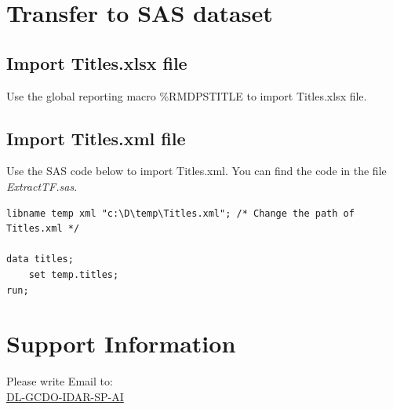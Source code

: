 \documentclass[11pt]{article}
\begin{document}
\section{Transfer to SAS dataset}
\label{sec:org0719498}
\subsection{Import Titles.xlsx file}
\label{sec:orgd325e5a}
Use the global reporting macro \%RMDPSTITLE to import Titles.xlsx file.

\subsection{Import Titles.xml file}
\label{sec:org46718c2}
Use the SAS code below to import Titles.xml. You can find the code in the file \emph{ExtractTF\ImportXML.sas}.

\begin{verbatim}
libname temp xml "c:\D\temp\Titles.xml"; /* Change the path of Titles.xml */

data titles;
    set temp.titles;
run;

\end{verbatim}

\section{Support Information}
\label{sec:org3c2619b}
\begin{info}
Please write Email to: \\

\href{mailto:DL-RNDUS-GCDO-IDAR-SP-AI@ITS.JNJ.com}{DL-GCDO-IDAR-SP-AI}
\end{info}
\end{document}
